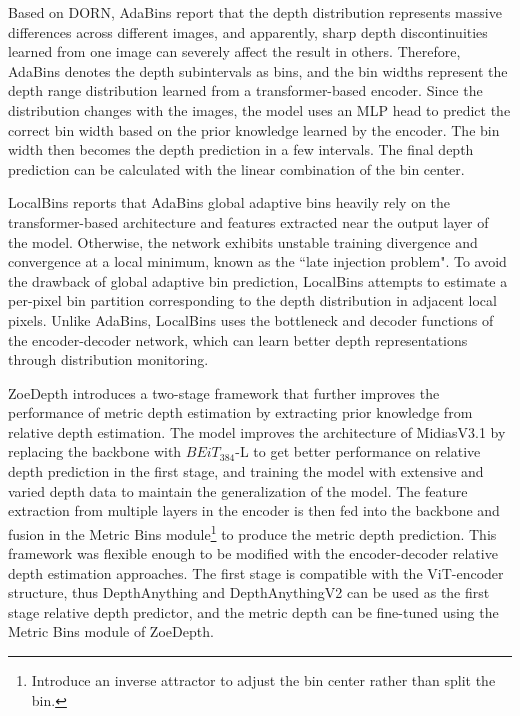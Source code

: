 \documentclass{article}
\begin{document}
Based on DORN, AdaBins\cite{bhat2021adabins} report that the depth distribution represents massive differences across different images, and apparently, sharp depth discontinuities learned from one image can severely affect the result in others. Therefore, AdaBins denotes the depth subintervals as bins, and the bin widths represent the depth range distribution learned from a transformer-based encoder. Since the distribution changes with the images, the model uses an MLP head to predict the correct bin width based on the prior knowledge learned by the encoder. The bin width then becomes the depth prediction in a few intervals. The final depth prediction can be calculated with the linear combination of the bin center.

LocalBins\cite{bhat2022localbins} reports that AdaBins global adaptive bins heavily rely on the transformer-based architecture and features extracted near the output layer of the model. Otherwise, the network exhibits unstable training divergence and convergence at a local minimum, known as the ``late injection problem". To avoid the drawback of global adaptive bin prediction, LocalBins attempts to estimate a per-pixel bin partition corresponding to the depth distribution in adjacent local pixels. Unlike AdaBins, LocalBins uses the bottleneck and decoder functions of the encoder-decoder network, which can learn better depth representations through distribution monitoring.

ZoeDepth\cite{bhat2023zoedepth} introduces a two-stage framework that further improves the performance of metric depth estimation by extracting prior knowledge from relative depth estimation. The model improves the architecture of MidiasV3.1 by replacing the backbone with $BEiT_{384}$-L\cite{beit} to get better performance on relative depth prediction in the first stage, and training the model with extensive and varied depth data to maintain the generalization of the model. The feature extraction from multiple layers in the encoder is then fed into the backbone and fusion in the Metric Bins module\footnote{Introduce an inverse attractor to adjust the bin center rather than split the bin.} to produce the metric depth prediction. This framework was flexible enough to be modified with the encoder-decoder relative depth estimation approaches. The first stage is compatible with the ViT-encoder structure, thus DepthAnything and DepthAnythingV2 can be used as the first stage relative depth predictor, and the metric depth can be fine-tuned using the Metric Bins module of ZoeDepth.
\end{document}
